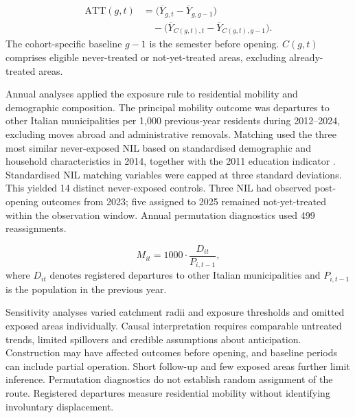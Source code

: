 \begin{equation}
\begin{aligned}
\mathrm{ATT}(g,t)&=\bigl(\overline{Y}_{g,t}-\overline{Y}_{g,g-1}\bigr)\\
&\quad-\bigl(\overline{Y}_{C(g,t),t}
-\overline{Y}_{C(g,t),g-1}\bigr).
\end{aligned}
\label{eq:did}
\end{equation}
The cohort-specific baseline $g-1$ is the semester before opening. $C(g,t)$ comprises eligible never-treated or not-yet-treated areas, excluding already-treated areas.

Annual analyses applied the exposure rule to residential mobility and demographic composition. The principal mobility outcome was departures to other Italian municipalities per 1,000 previous-year residents during 2012--2024, excluding moves abroad and administrative removals. Matching used the three most similar never-exposed NIL based on standardised demographic and household characteristics in 2014, together with the 2011 education indicator \cite{biferale_2026}. Standardised NIL matching variables were capped at three standard deviations. This yielded 14 distinct never-exposed controls. Three NIL had observed post-opening outcomes from 2023; five assigned to 2025 remained not-yet-treated within the observation window. Annual permutation diagnostics used 499 reassignments.

\begin{equation}
M_{it}=1000\cdot\frac{D_{it}}{P_{i,t-1}},
\label{eq:migration}
\end{equation}
where $D_{it}$ denotes registered departures to other Italian municipalities and $P_{i,t-1}$ is the population in the previous year.

Sensitivity analyses varied catchment radii and exposure thresholds and omitted exposed areas individually. Causal interpretation requires comparable untreated trends, limited spillovers and credible assumptions about anticipation. Construction may have affected outcomes before opening, and baseline periods can include partial operation. Short follow-up and few exposed areas further limit inference. Permutation diagnostics do not establish random assignment of the route. Registered departures measure residential mobility without identifying involuntary displacement.
